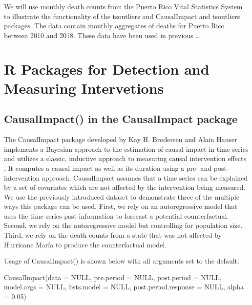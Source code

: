 \documentclass[12pt]{article}
\newenvironment{Shaded}{\begin{snugshade}}{\end{snugshade}}
\newcommand{\AttributeTok}[1]{\textcolor[rgb]{0.77,0.63,0.00}{#1}}
\newcommand{\ConstantTok}[1]{\textcolor[rgb]{0.00,0.00,0.00}{#1}}
\newcommand{\FloatTok}[1]{\textcolor[rgb]{0.00,0.00,0.81}{#1}}
\newcommand{\FunctionTok}[1]{\textcolor[rgb]{0.00,0.00,0.00}{#1}}
\newcommand{\NormalTok}[1]{#1}
\begin{document}
We will use monthly death counts from the Puerto Rico Vital Statistics
System to illustrate the functionality of the tsoutliers and
\textsf{CausalImpact} and \textsf{tsoutliers} packages. The data contain
monthly aggregates of deaths for Puerto Rico between 2010 and 2018.
These data have been used in previous \ldots{}

\hypertarget{r-packages-for-detection-and-measuring-intervetions}{%
\section{R Packages for Detection and Measuring
Intervetions}\label{r-packages-for-detection-and-measuring-intervetions}}

\hypertarget{causalimpact-in-the-causalimpact-package}{%
\subsection{CausalImpact() in the CausalImpact
package}\label{causalimpact-in-the-causalimpact-package}}

The \textsf{CausalImpact} package developed by Kay H. Brodersen and
Alain Hauser implements a Bayesian approach to the estimation of causal
impact in time series and utilizes a classic, inductive approach to
measuring causal intervention effects \citep{brodersen2015inferring}. It
computes a causal impact as well as its duration using a pre- and
post-intervention approach. \textsf{CausalImpact} assumes that a time
series can be explained by a set of covariates which are not affected by
the intervention being measured. We use the previously introduced
dataset to demonstrate three of the multiple ways this package can be
used. First, we rely on an autoregressive model that uses the time
series past information to forecast a potential counterfactual. Second,
we rely on the autoregressive model but controlling for population size.
Third, we rely on the death counts from a state that was not affected by
Hurricane María to produce the counterfactual model.

Usage of \textsf{CausalImpact()} is shown below with all arguments set
to the default:

\begin{Shaded}
\begin{Highlighting}[]
\FunctionTok{CausalImpact}\NormalTok{(}\AttributeTok{data =} \ConstantTok{NULL}\NormalTok{, }\AttributeTok{pre.period =} \ConstantTok{NULL}\NormalTok{, }\AttributeTok{post.period =} \ConstantTok{NULL}\NormalTok{, }
             \AttributeTok{model.args =} \ConstantTok{NULL}\NormalTok{,  }\AttributeTok{bsts.model =} \ConstantTok{NULL}\NormalTok{, }
             \AttributeTok{post.period.response =} \ConstantTok{NULL}\NormalTok{, }\AttributeTok{alpha =} \FloatTok{0.05}\NormalTok{)}
\end{Highlighting}
\end{Shaded}
\end{document}
